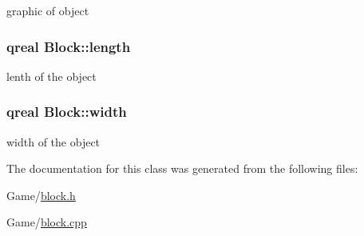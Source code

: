 graphic of object 

\subsubsection[{\texorpdfstring{length}{length}}]{\setlength{\rightskip}{0pt plus 5cm}qreal Block\+::length}\hypertarget{class_block_a7ad40ed8c8d961b1ca2117835853a9c5}{}\label{class_block_a7ad40ed8c8d961b1ca2117835853a9c5}


lenth of the object 

\subsubsection[{\texorpdfstring{width}{width}}]{\setlength{\rightskip}{0pt plus 5cm}qreal Block\+::width}\hypertarget{class_block_af7693d02f586bf02df6181995a66b768}{}\label{class_block_af7693d02f586bf02df6181995a66b768}


width of the object 



The documentation for this class was generated from the following files\+:\begin{DoxyCompactItemize}
\item 
Game/\hyperlink{block_8h}{block.\+h}\item 
Game/\hyperlink{block_8cpp}{block.\+cpp}\end{DoxyCompactItemize}
